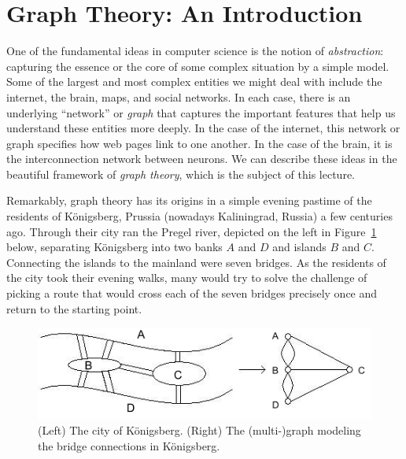 \documentclass[11pt]{article}
\begin{document}
\maketitle

\section{Graph Theory: An Introduction}
\label{scn:intro}

One of the fundamental ideas in computer science is the notion of \emph{abstraction}: capturing the essence or the core of some complex situation by a simple model. Some of the largest and most complex entities we might deal with include the internet, the brain, maps, and social networks. In each case, there is an underlying ``network'' or \emph{graph} that captures the important features that help us 
understand these entities more deeply. In the case of the internet, this network or graph specifies how web pages link to one another. In the case of the brain, it is the interconnection network between neurons. We can describe these ideas in the beautiful framework of \emph{graph theory}, which is the subject of this lecture. 

Remarkably, graph theory has its origins in a simple evening pastime of the residents of K\"onigsberg, Prussia (nowadays Kaliningrad, Russia) a few centuries ago. Through their city ran the Pregel river, depicted on the left in Figure~\ref{fig:map} below, separating K\"{o}nigsberg into two banks $A$ and $D$ and islands $B$ and $C$. Connecting the islands to the mainland were seven bridges. As the residents of the city took their evening walks, many would try to solve the challenge of picking a route that would cross each of the seven bridges precisely once and return to the starting point. 

\begin{figure}[h]\label{fig:map}
\centering
\includegraphics[scale=0.7]{bridges.png}
\caption{(Left) The city of K\"onigsberg. (Right) The (multi-)graph modeling the bridge connections in K\"onigsberg.}
\centering
\end{figure}
\end{document}
